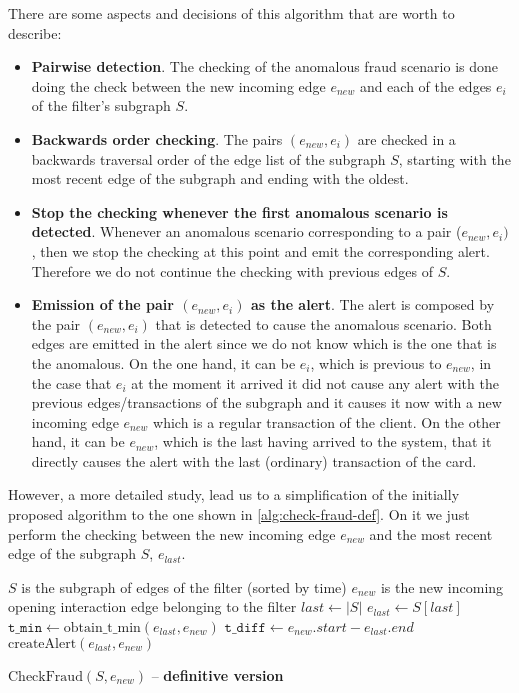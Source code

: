 There are some aspects and decisions of this algorithm that are worth to describe:

\begin{itemize}
    \item \textbf{Pairwise detection}. The checking of the anomalous fraud scenario is done doing the check between the new incoming edge $e_{new}$ and each of the edges $e_i$ of the filter's subgraph $S$.
    \item \textbf{Backwards order checking}. The pairs $(e_{new}, e_i)$ are checked in a backwards traversal order of the edge list of the subgraph $S$, starting with the most recent edge of the subgraph and ending with the oldest.  
    \item \textbf{Stop the checking whenever the first anomalous scenario is detected}. Whenever an anomalous scenario corresponding to a pair ($e_{new}, e_i)$, then we stop the checking at this point and emit the corresponding alert. Therefore we do not continue the checking with previous edges of $S$. 
    \item \textbf{Emission of the pair $(e_{new}, e_i)$ as the alert}. The alert is composed by the pair $(e_{new}, e_i)$ that is detected to cause the anomalous scenario. Both edges are emitted in the alert since we do not know which is the one that is the anomalous. On the one hand, it can be $e_i$, which is previous to $e_{new}$, in the case that $e_i$ at the moment it arrived it did not cause any alert with the previous edges/transactions of the subgraph and it causes it now with a new incoming edge $e_{new}$ which is a regular transaction of the client. On the other hand, it can be $e_{new}$, which is the last having arrived to the system, that it directly causes the alert with the last (ordinary) transaction of the card.
\end{itemize}

However, a more detailed study, lead us to a simplification of the initially proposed algorithm to the one shown in \ref{alg:check-fraud-def}. On it we just perform the checking between the new incoming edge $e_{new}$ and the most recent edge of the subgraph $S$, $e_{last}$.

\begin{algorithm}[H]
  \small
  \begin{algorithmic}[1]
  \REQUIRE $S$ is the subgraph of edges of the filter (sorted by time)
  \REQUIRE $e_{new}$ is the new incoming opening interaction edge belonging to the filter 
  \STATE $last \gets |S|$
  \STATE $e_{last} \gets S[last]$
  \STATE $\texttt{t\_min} \gets \text{obtain\_t\_min}(e_{last}, e_{new})$
  \STATE $\texttt{t\_diff} \gets e_{new}.start - e_{last}.end$
    \STATE $\text{createAlert}(e_{last}, e_{new})$
  \ENDIF
  \end{algorithmic}
  \caption{$\text{CheckFraud}(S, e_{new})$ -- \textbf{definitive version}}
  \label{alg:check-fraud-def}
\end{algorithm}


